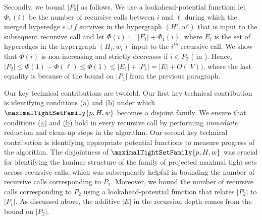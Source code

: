 Secondly, we bound $|P_2|$ as follows. We use a lookahead-potential function: let $\Phi_1(i)$ be the number of recursive calls between $i$ and $\ell$
during which the merged hyperedge $e\cup f$ survives in the hypergraph $(H', w')$ that is input to the subsequent recursive call
and let $\Phi(i):=|E_i|+\Phi_1(i)$, where $E_i$ is the set of hyperedges in the hypergraph $(H_i, w_i)$ input to the $i^{th}$ recursive call. We show that $\Phi(i)$ is non-increasing and strictly decreases if 
$i\in P_2$ 
( in ). Hence, $|P_2|\le \Phi(1)-\Phi(\ell)\le \Phi(1) \le |E_1|+|P_1|=|E|+O(|V))$, where the last equality is because of the bound on $|P_1|$ from the previous paragraph.  

\begin{remark}
    Our key technical contributions are twofold. Our first key technical contribution is identifying conditions \hyperlink{WeakToStrong(a)}{(a)} and \hyperlink{WeakToStrong(b)}{(b)} under which $\maximalTightSetFamily{p, H, w}$ becomes a disjoint family. We ensure that conditions \hyperlink{WeakToStrong(a)}{(a)} and \hyperlink{WeakToStrong(b)}{(b)} hold in every recursive call by performing \emph{immediate} reduction and clean-up steps in the algorithm. 
    Our second key technical contribution is identifying appropriate potential functions to measure progress of the algorithm. The disjointness of $\maximalTightSetFamily{p, H, w}$ was crucial for identifying the laminar structure of the family of projected maximal tight sets across recursive calls, which was subsequently helpful in bounding the number of recursive calls corresponding to $P_1$. 
    Moreover, we bound the number of recursive calls corresponding to $P_2$ using a lookahead-potential function that relates $|P_2|$ to $|P_1|$. As discussed above, the additive $|E|$ in the recursion depth comes from the bound on $|P_2|$.
\end{remark}